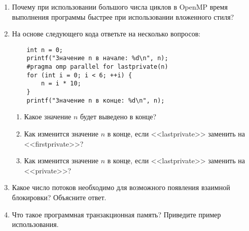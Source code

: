 \begin{enumerate}

    \item Почему при использовании большого числа циклов в OpenMP время выполнения программы быстрее при использовании вложенного стиля?

    \item На основе следующего кода ответьте на несколько вопросов:
    \begin{verbatim}
    int n = 0;
    printf("Значение n в начале: %d\n", n);
    #pragma omp parallel for lastprivate(n)
    for (int i = 0; i < 6; ++i) {
        n = i * 10;
    }
    printf("Значение n в конце: %d\n", n);
    \end{verbatim}

    \begin{enumerate}[label*=\arabic*.]
        \item Какое значение $n$ будет выведено в конце?
        \item Как изменится значение $n$ в конце, если <<lastprivate>> заменить на <<firstprivate>>?
        \item Как изменится значение $n$ в конце, если <<lastprivate>> заменить на <<private>>?
    \end{enumerate}
    
     \item Какое число потоков необходимо для возможного появления взаимной блокировки? Объясните ответ.

     \item Что такое программная транзакционная память? Приведите пример использования.


\end{enumerate}

